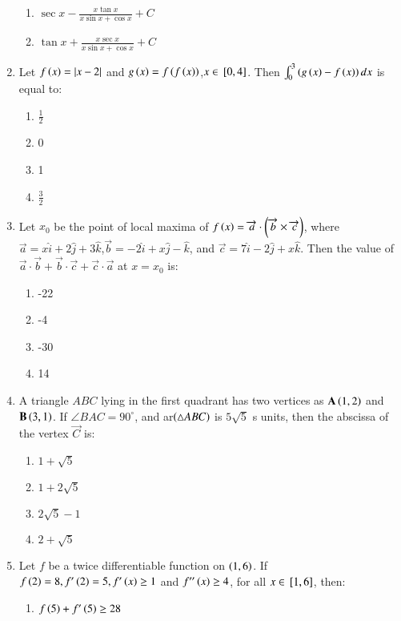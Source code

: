 \documentclass[journal]{IEEEtran}
\begin{document}
\begin{enumerate}
\begin{enumerate}
    \item $\sec x-\frac{x\tan x}{x\sin x+\cos x}+C$
    \item $\tan x+\frac{x\sec x}{x \sin x + \cos x}+C$
\end{enumerate}
\item Let $f\left(x\right)=\left\vert x-2\right\vert$ and $g\left(x\right)=f\left(f\left(x\right)\right)$,$x\in {}\left[0, 4\right]$. Then $\int_0^3 \left(g\left(x\right)-f\left(x\right)\right) dx$ is equal to:
\begin{enumerate}
    \item $\frac{1}{2}$
    \item 0
    \item 1
    \item $\frac{3}{2}$
\end{enumerate}
\item Let $x_0$ be the point of local maxima of $f\left(x\right)=\overrightarrow{a}\cdot\left(\overrightarrow{b}\times \overrightarrow{c}\right)$, where $\overrightarrow{a}=x\hat{i}+2\hat{j}+3\hat{k}$,$\overrightarrow{b}=-2\hat{i}+x\hat{j}-\hat{k}$, and $\overrightarrow{c}=7\hat{i}-2\hat{j}+x\hat{k}$. Then the value of $ \overrightarrow{a}\cdot \overrightarrow{b}+\overrightarrow{b}\cdot \overrightarrow{c}+\overrightarrow{c}\cdot \overrightarrow{a}$ at $x=x_0$ is:
\begin{enumerate}
    \item -22
    \item -4
    \item -30
    \item 14
\end{enumerate}
\item A triangle $ABC$ lying in the first quadrant has two vertices as $ \mathbf{A}\left(1,2\right)$ and $\mathbf{B}\left(3,1\right)$. If $\angle BAC=90^\circ$, and ar$\left(\triangle ABC\right)$ is $5\sqrt{5}$ s units, then the abscissa of the vertex $\vec{C}$ is:
\begin{enumerate}
    \item $1+\sqrt{5}$
    \item $1+2\sqrt{5}$
    \item $2\sqrt{5}-1$
    \item $2+\sqrt{5}$
\end{enumerate}
\item Let $f$ be a twice differentiable function on $\left(1,6\right)$. If $f\left(2\right)=8, f^\prime\left(2\right)=5, f^\prime\left(x\right)\geq1$ and $f'^\prime\left(x\right)\geq4$, for all $x\in {}\left[1,6\right]$, then:
\begin{enumerate}
    \item $f\left(5\right)+f^\prime\left(5\right)\geq28$

\end{enumerate}
\end{enumerate}
\end{document}
